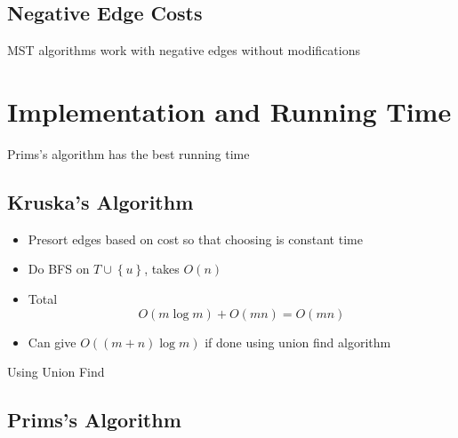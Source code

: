   \subsection{Negative Edge Costs}

    MST algorithms work with negative edges without modifications

\section{Implementation and Running Time}

  Prims's algorithm has the best running time

  \subsection{Kruska's Algorithm}

    \begin{itemize}
      \item Presort edges based on cost so that choosing is constant time
      \item Do BFS on $ T \cup \left\{ u \right\} $, takes $ O\left( n \right) $
      \item Total
      \begin{equation}
        O\left( m \log m \right) + O\left( m n \right) = O\left( m n \right)
      \end{equation}

      \item Can give $ O\left( \left( m + n \right) \log m \right) $ if done
      using union find algorithm
    \end{itemize}

    \begin{algorithm}[H]
      \caption{Using Union Find}

    \end{algorithm}

  \subsection{Prims's Algorithm}

